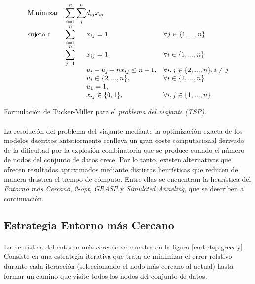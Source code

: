 \documentclass[spanish]{article}
\begin{document}
			\begin{eqfloat}
				\begin{equation}
					\begin{array}{ll@{}ll}
						\text{Minimizar}	& \displaystyle\sum\limits_{i = 1}^{n}\sum\limits_{j}^{n} & d_{ij}x_{ij} &\\
						\text{sujeto a}		& \displaystyle\sum\limits_{i = 1}^{n}	&	x_{ij} 	= 1,  & \forall j \in \{1,...,n\} \\
															& \displaystyle\sum\limits_{j = 1}^{n}	&	x_{ij} 	= 1,  & \forall i \in \{1,...,n\} \\
															& 				&	u_i - u_j + n x_{ij}	\leq n-1,  & \forall i, j \in \{2,...,n\}, i \neq j \\
															&                               &	u_{i} \in \{2,...,n\}, 		& \forall i \in \{2,...,n\} \\
															&                               &	u_{1}  = 1, 	& \\
															&                               &	x_{ij} \in \{0,1\}, 	& \forall i,j \in \{1,...,n\}
					\end{array}
				\end{equation}
				\caption{Formulación de Tucker-Miller para el \emph{problema del viajante (TSP)}.}
				\label{eq:tsp_tm}
			\end{eqfloat}


			\paragraph{}
			La resolución del problema del viajante mediante la optimización exacta de los modelos descritos anteriormente conlleva un gran coste computacional derivado de la dificultad por la explosión combinatoria que se produce cuando el número de nodos del conjunto de datos crece. Por lo tanto, existen alternativas que ofrecen resultados aproximados mediante distintas heurísticas que reducen de manera drástica el tiempo de cómputo. Entre ellas se encuentran la heurística del \emph{Entorno más Cercano}, \emph{2-opt}, \emph{GRASP} y \emph{Simulated Anneling}, que se describen a continuación.

		\subsection{Estrategia Entorno más Cercano}

			\paragraph{}
			La heurística del entorno más cercano se muestra en la figura \ref{code:tsp-greedy}. Consiste en una estrategia iterativa que trata de minimizar el error relativo durante cada iteracción (seleccionando el nodo más cercano al actual) hasta formar un camino que visite todos los nodos del conjunto de datos.
\end{document}
